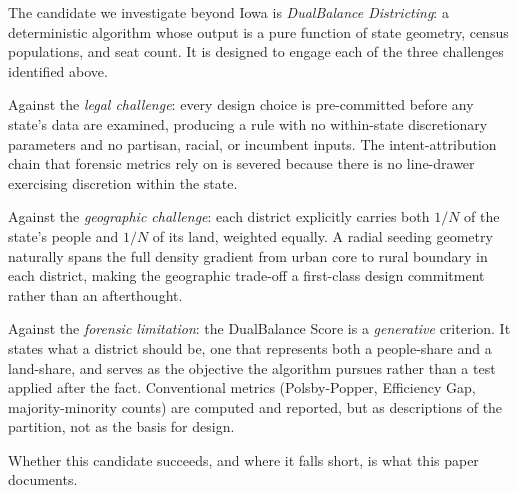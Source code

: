 The candidate we investigate beyond Iowa is \emph{DualBalance
Districting}: a deterministic algorithm whose output is a pure
function of state geometry, census populations, and seat count. It
is designed to engage each of the three challenges identified above.

Against the \emph{legal challenge}: every design choice is
pre-committed before any state's data are examined, producing a rule
with no within-state discretionary parameters and no partisan,
racial, or incumbent inputs. The intent-attribution chain that
forensic metrics rely on is severed because there is no line-drawer
exercising discretion within the state.

Against the \emph{geographic challenge}: each district explicitly
carries both $1/N$ of the state's people and $1/N$ of its land,
weighted equally. A radial seeding geometry naturally spans the full
density gradient from urban core to rural boundary in each district,
making the geographic trade-off a first-class design commitment
rather than an afterthought.

Against the \emph{forensic limitation}: the DualBalance Score is a
\emph{generative} criterion. It states what a district should be,
one that represents both a people-share and a land-share, and serves
as the objective the algorithm pursues rather than a test applied
after the fact. Conventional metrics (Polsby-Popper, Efficiency Gap,
majority-minority counts) are computed and reported, but as
descriptions of the partition, not as the basis for design.

Whether this candidate succeeds, and where it falls short, is what
this paper documents.
